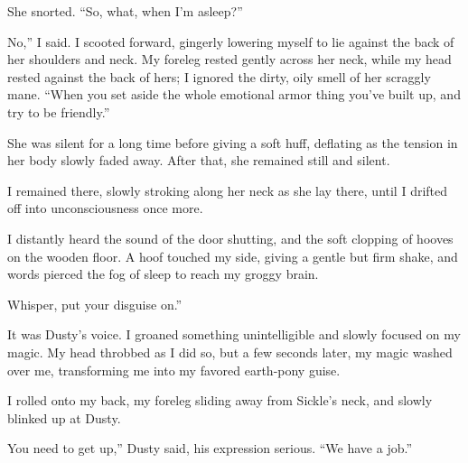She snorted. “So, what, when I’m asleep?”

\leavevmode{}No,” I said. I scooted forward, gingerly lowering myself to lie against the back of her shoulders and neck. My foreleg rested gently across her neck, while my head rested against the back of hers; I ignored the dirty, oily smell of her scraggly mane. “When you set aside the whole emotional armor thing you’ve built up, and try to be friendly.”

She was silent for a long time before giving a soft huff, deflating as the tension in her body slowly faded away. After that, she remained still and silent.

I remained there, slowly stroking along her neck as she lay there, until I drifted off into unconsciousness once more.

{\br}%
I distantly heard the sound of the door shutting, and the soft clopping of hooves on the wooden floor. A hoof touched my side, giving a gentle but firm shake, and words pierced the fog of sleep to reach my groggy brain.

\leavevmode{}Whisper, put your disguise on.”

It was Dusty’s voice. I groaned something unintelligible and slowly focused on my magic. My head throbbed as I did so, but a few seconds later, my magic washed over me, transforming me into my favored earth-pony guise.

I rolled onto my back, my foreleg sliding away from Sickle’s neck, and slowly blinked up at Dusty.

\leavevmode{}You need to get up,” Dusty said, his expression serious. “We have a job.”